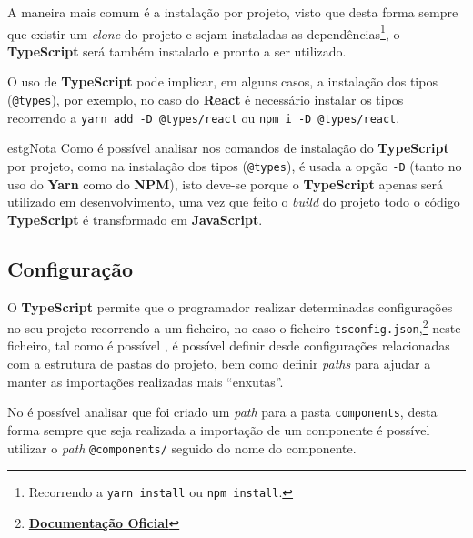 A maneira mais comum é a instalação por projeto, visto que desta forma sempre que existir um \textit{clone} do projeto e sejam instaladas as dependências\footnote{Recorrendo a \texttt{yarn install} ou \texttt{npm install}.}, o \textbf{TypeScript} será também instalado e pronto a ser utilizado.

O uso de \textbf{TypeScript} pode implicar, em alguns casos, a instalação dos tipos (\texttt{@types}), por exemplo, no caso do \textbf{React} é necessário instalar os tipos recorrendo a \texttt{yarn add -D @types/react} ou \texttt{npm i -D @types/react}.

\begin{mybox}{estg}{Nota}
	Como é possível analisar nos comandos de instalação do \textbf{TypeScript} por projeto, como na instalação dos tipos (\texttt{@types}), é usada a opção \texttt{-D} (tanto no uso do \textbf{Yarn} como do \textbf{NPM}), isto deve-se porque o \textbf{TypeScript} apenas será utilizado em desenvolvimento, uma vez que feito o \textit{build} do projeto todo o código \textbf{TypeScript} é transformado em \textbf{JavaScript}.
\end{mybox}

\subsection{Configuração}

O \textbf{TypeScript} permite que o programador realizar determinadas configurações no seu projeto recorrendo a um ficheiro, no caso o ficheiro \texttt{tsconfig.json},\footnote{\textbf{\href{https://www.typescriptlang.org/tsconfig}{Documentação Oficial}}} neste ficheiro, tal como é possível , é possível definir desde configurações relacionadas com a estrutura de pastas do projeto, bem como definir \textit{paths} para ajudar a manter as importações realizadas mais ``enxutas''.

No  é possível analisar que foi criado um \textit{path} para a pasta \texttt{components}, desta forma sempre que seja realizada a importação de um componente é possível utilizar o \textit{path} \texttt{@components/} seguido do nome do componente.
